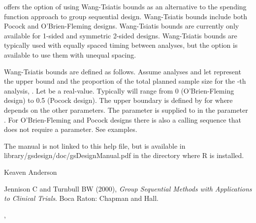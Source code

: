\begin{Description}\relax
{} offers the option of using Wang-Tsiatis bounds as an alternative to 
the spending function approach to group sequential design.
Wang-Tsiatis bounds include both Pocock and O'Brien-Fleming designs.
Wang-Tsiatis bounds are currently only available for 1-sided and symmetric 2-sided designs.
Wang-Tsiatis bounds are typically used with equally spaced timing between analyses, but
the option is available to use them with unequal spacing.
\end{Description}
\begin{Details}\relax
Wang-Tsiatis bounds are defined as follows.
Assume  analyses and let  represent the upper bound and  the proportion of the
total planned sample size for the -th analysis, 
.
Let  be a real-value. 
Typically  will range from 0 (O'Brien-Fleming design) to 0.5 (Pocock design).
The upper boundary is defined by 
for  where  depends on the other parameters.
The parameter  is supplied to  in the parameter .
For O'Brien-Fleming and Pocock designs there is also a calling sequence that does not require a parameter.
See examples.
\end{Details}
\begin{Note}\relax
The manual is not linked to this help file, but is available in library/gsdesign/doc/gsDesignManual.pdf
in the directory where R is installed.
\end{Note}
\begin{Author}\relax
Keaven Anderson 
\end{Author}
\begin{References}\relax
Jennison C and Turnbull BW (2000), \emph{Group Sequential Methods with Applications to Clinical Trials}.
Boca Raton: Chapman and Hall.
\end{References}
\begin{SeeAlso}\relax
{}, 
\end{SeeAlso}
